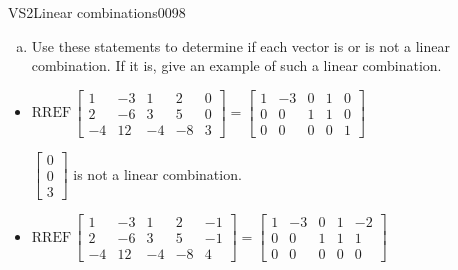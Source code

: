 \begin{exercise}{VS2}{Linear combinations}{0098}
\begin{exerciseStatement}
\begin{enumerate}[(a)]
\begin{itemize}
 
\end{itemize}

     
\item  

 Use these statements to determine if each vector is or is not a linear combination. If it is, give an example of such a linear combination. 

 
\end{enumerate}

     \end{exerciseStatement}
 \begin{exerciseAnswer} 

\begin{itemize}
\item  

 \(
\mathrm{RREF}\, \left[\begin{array}{cccc|c}
1 & -3 & 1 & 2 & 0 \\
2 & -6 & 3 & 5 & 0 \\
-4 & 12 & -4 & -8 & 3
\end{array}\right] = \left[\begin{array}{cccc|c}
1 & -3 & 0 & 1 & 0 \\
0 & 0 & 1 & 1 & 0 \\
0 & 0 & 0 & 0 & 1
\end{array}\right]
                        \) 

 

 \(\left[\begin{array}{c}
0 \\
0 \\
3
\end{array}\right]\) is not a linear combination. 

 
\item  

 \(
\mathrm{RREF}\, \left[\begin{array}{cccc|c}
1 & -3 & 1 & 2 & -1 \\
2 & -6 & 3 & 5 & -1 \\
-4 & 12 & -4 & -8 & 4
\end{array}\right] = \left[\begin{array}{cccc|c}
1 & -3 & 0 & 1 & -2 \\
0 & 0 & 1 & 1 & 1 \\
0 & 0 & 0 & 0 & 0
\end{array}\right]
                        \) 

 


\end{itemize}
\end{exerciseAnswer}
\end{exercise}
